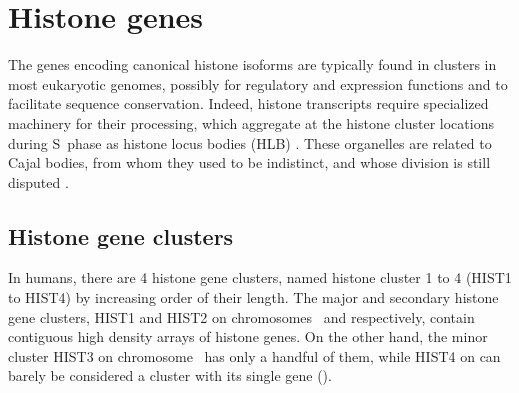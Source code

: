 \documentclass[10pt,a4paper,onecolumn,article]{memoir}
\begin{document}
  \section{Histone genes}

    The genes encoding canonical histone isoforms are typically found in clusters in most
    eukaryotic genomes, possibly for regulatory and expression functions and to facilitate
    sequence conservation. Indeed, histone transcripts require specialized machinery for
    their processing, which aggregate at the histone cluster locations during S~phase as
    histone locus bodies (HLB) \citep{human-first-HLB-report, human-HLB-report-GhuleEtAl2008}.
    These organelles are related to Cajal bodies, from whom they used to be indistinct, and
    whose division is still disputed \citep{CB-HLB-review}.

    \subsection{Histone gene clusters}
      In humans, there are 4 histone gene clusters, named histone cluster 1 to 4 (HIST1 to HIST4)
      by increasing order of their length. The major and secondary histone gene clusters,
      HIST1 and HIST2 on chromosomes~\HISTOneLocus{} and \HISTTwoLocus{} respectively,
      contain contiguous high density arrays of histone genes. On the other hand, the minor
      cluster HIST3 on chromosome~\HISTThreeLocus{} has only a handful of them, while HIST4
      on \HISTFourLocus{} can barely be considered a cluster with its single gene
      ().
\end{document}
